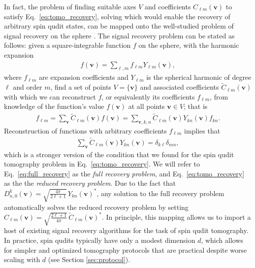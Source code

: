 \documentclass[notitlepage,twocolumn]{revtex4-2}
\newcommand{\p}[1]{\left(#1\right)} %
\renewcommand{\v}{\bm} %
\renewcommand{\set}[1]{\{#1\}} %
\newcommand{\1}{\mathds{1}}
\begin{document}
In fact, the problem of finding suitable axes $V$ and coefficients $C_{\ell m}\p{\v v}$ to satisfy Eq.~\eqref{eq:tomo_recovery}, solving which would enable the recovery of arbitrary spin qudit states, can be mapped onto the well-studied problem of signal recovery on the sphere \cite{mcewen2011novel, rauhut2011sparse, alem2012sparse, khalid2014optimaldimensionality}.
The signal recovery problem can be stated as follows: given a square-integrable function $f$ on the sphere, with the harmonic expansion
\begin{align}
  f\p{\v v} = \sum_{\ell,m} f_{\ell m} Y_{\ell m}\p{\v v},
\end{align}
where $f_{\ell m}$ are expansion coefficients and $Y_{\ell m}$ is the spherical harmonic of degree $\ell$ and order $m$, find a set of points $V=\set{\v v}$ and associated coefficients $\tilde C_{\ell m}\p{\v v}$ with which we can reconstruct $f$, or equivalently its coefficients $f_{\ell m}$, from knowledge of the function's value $f\p{\v v}$ at all points $\v v\in V$; that is
\begin{align}
  f_{\ell m} = \sum_{\v v} \tilde C_{\ell m}\p{\v v} f\p{\v v}
  = \sum_{\v v,k,n} \tilde C_{\ell m}\p{\v v} Y_{kn}\p{\v v} f_{kn}.
\end{align}
Reconstruction of functions with arbitrary coefficients $f_{\ell m}$ implies that
\begin{align}
  \sum_{\v v} \tilde C_{\ell m}\p{\v v} Y_{kn}\p{\v v}
  = \delta_{k\ell} \delta_{mn},
  \label{eq:full_recovery}
\end{align}
which is a stronger version of the condition that we found for the spin qudit tomography problem in Eq.~\eqref{eq:tomo_recovery}.
We will refer to Eq.~\eqref{eq:full_recovery} as the {\it full recovery problem}, and Eq.~\eqref{eq:tomo_recovery} as the the {\it reduced recovery problem}.
Due to the fact that $D^k_{n,0}\p{\v v} = \sqrt{\frac{4\pi}{2\ell+1}}\, Y_{kn}\p{\v v}^*$, any solution to the full recovery problem automatically solves the reduced recovery problem by setting $C_{\ell m}\p{\v v} = \sqrt{\frac{2\ell+1}{4\pi}}\, \tilde C_{\ell m}\p{\v v}^*$.
In principle, this mapping allows us to import a host of existing signal recovery algorithms \cite{mcewen2011novel, rauhut2011sparse, alem2012sparse, khalid2014optimaldimensionality} for the task of spin qudit tomography.
In practice, spin qudits typically have only a modest dimension $d$, which allows for simpler and optimized tomography protocols that are practical despite worse scaling with $d$ (see Section \ref{sec:protocol}).
\end{document}
